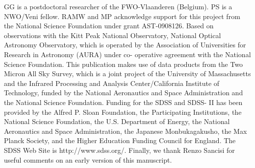 \documentclass[traditabstract]{aa}
\begin{document}
GG is a postdoctoral researcher of the FWO-Vlaanderen (Belgium). PS is
a NWO/Veni fellow. RAMW and MP acknowledge support for this project
from the National Science Foundation under grant AST-0908126. Based on
observations with the Kitt Peak National Observatory, National Optical
Astronomy Observatory, which is operated by the Association of
Universities for Research in Astronomy (AURA) under co- operative
agreement with the National Science Foundation. 
This publication makes use of data products from the Two Micron All
Sky Survey, which is a joint project of the University of
Massachusetts and the Infrared Processing and Analysis
Center/California Institute of Technology, funded by the National
Aeronautics and Space Administration and the National Science
Foundation. Funding for the SDSS and SDSS- II has been provided by the
Alfred P. Sloan Foundation, the Participating Institutions, the
National Science Foundation, the U.S. Department of Energy, the
National Aeronautics and Space Administration, the Japanese
Monbukagakusho, the Max Planck Society, and the Higher Education
Funding Council for England. The SDSS Web Site is
http://www.sdss.org/. Finally, we thank Renzo Sancisi for useful
comments on an early version of this manuscript. 
\end{document}
